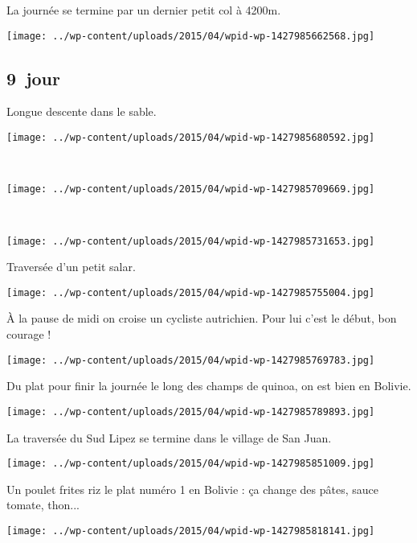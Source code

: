 \pagebreak
 La journée se termine par un dernier petit col à 4200m.
\begin{center} \texttt{[image: ../wp-content/uploads/2015/04/wpid-wp-1427985662568.jpg]} \end{center}

 \subsection*{9\ieme\ jour} 

 Longue descente dans le sable.
\begin{center} \texttt{[image: ../wp-content/uploads/2015/04/wpid-wp-1427985680592.jpg]} \end{center}
\vspace{-\topsep}

\pagebreak
~
\begin{center} \texttt{[image: ../wp-content/uploads/2015/04/wpid-wp-1427985709669.jpg]} \end{center}
~\\
\begin{center} \texttt{[image: ../wp-content/uploads/2015/04/wpid-wp-1427985731653.jpg]} \end{center}
\vspace{-\topsep}

\pagebreak
 Traversée d'un petit salar.
\begin{center} \texttt{[image: ../wp-content/uploads/2015/04/wpid-wp-1427985755004.jpg]} \end{center}

 À la pause de midi on croise un cycliste autrichien. Pour lui c'est le début, bon courage !
\begin{center} \texttt{[image: ../wp-content/uploads/2015/04/wpid-wp-1427985769783.jpg]} \end{center}
\vspace{-\topsep}

\pagebreak
 Du plat pour finir la journée le long des champs de quinoa, on est bien en Bolivie.
\begin{center} \texttt{[image: ../wp-content/uploads/2015/04/wpid-wp-1427985789893.jpg]} \end{center}

 La traversée du Sud Lipez se termine dans le village de San Juan.
\begin{center} \texttt{[image: ../wp-content/uploads/2015/04/wpid-wp-1427985851009.jpg]} \end{center}
\vspace{-\topsep}

\pagebreak
 Un poulet frites riz le plat numéro 1 en Bolivie : ça change des pâtes, sauce tomate, thon...
 
 \vspace{3.5mm}
\begin{center} \texttt{[image: ../wp-content/uploads/2015/04/wpid-wp-1427985818141.jpg]} \end{center}
